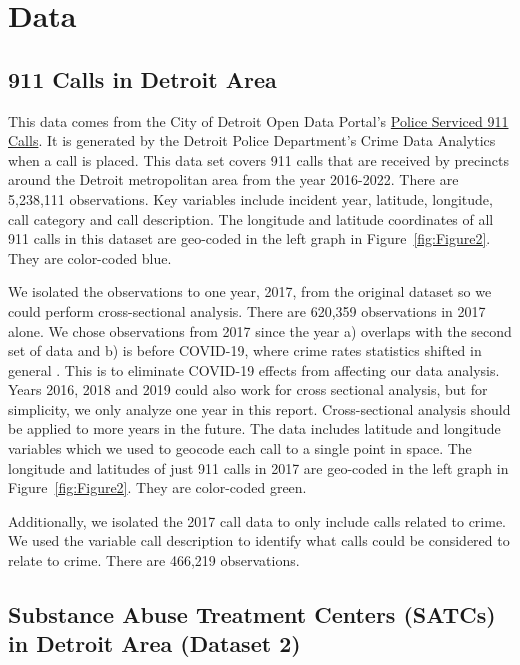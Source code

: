 \documentclass[12pt]{article}
\begin{document}
\section{Data}
\label{sec:data}

\subsection{911 Calls in Detroit Area}

This data comes from the City of Detroit Open Data Portal's   \href{https://data.detroitmi.gov/datasets/detroitmi::police-serviced-911-calls/about}{Police Serviced 911 Calls}. It is generated by the Detroit Police Department's Crime Data Analytics when a call is placed. This data set covers 911 calls that are received by precincts around the Detroit metropolitan area from the year 2016-2022. There are 5,238,111 observations. Key variables include incident year, latitude, longitude, call category and call description. The longitude and latitude coordinates of all 911 calls in this dataset are geo-coded in the left graph in Figure~\ref{fig:Figure2}. They are color-coded blue. 

We isolated the observations to one year, 2017, from the original dataset so we could perform cross-sectional analysis. There are 620,359 observations in 2017 alone. We chose observations from 2017 since the year a) overlaps with the second set of data and b) is before COVID-19, where crime rates statistics shifted in general \cite{covid_and_crime}. This is to eliminate COVID-19 effects from affecting our data analysis. Years 2016, 2018 and 2019 could also work for cross sectional analysis, but for simplicity, we only analyze one year in this report. Cross-sectional analysis should be applied to more years in the future. The data includes latitude and longitude variables which we used to geocode each call to a single point in space. The longitude and latitudes of just 911 calls in 2017 are geo-coded in the left graph in Figure~\ref{fig:Figure2}. They are color-coded green. 

Additionally, we isolated the 2017 call data to only include calls related to crime. We used the variable call description to identify what calls could be considered to relate to crime. There are 466,219 observations. 

\subsection{Substance Abuse Treatment Centers (SATCs) in Detroit Area (Dataset 2)}
\end{document}

